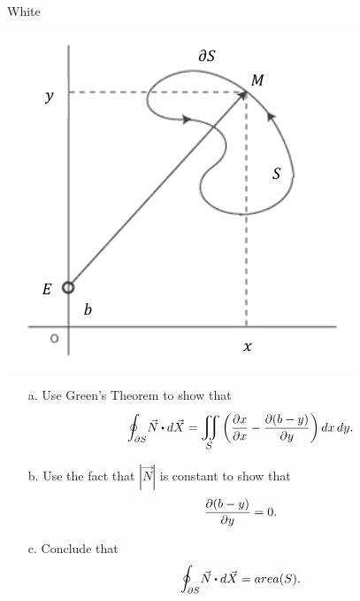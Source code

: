 \documentclass[titlepage]{article}
\begin{document}
\vspace{-.05em}
\begin{cproblem}{4}{White}\ \\
\vspace{-2em}
\begin{center} \includegraphics[scale=.45]{planimeter} \end{center}
\begin{itemize}
\vspace{-2em}
\item[a.] Use Green's Theorem to show that
$$ \mathlarger\oint_{\p S} \vec{N} \bigcdot d\vec{X} = \bigiint{S}{}\left( \frac{\p x}{\p x} - \frac{\p (b-y)}{\p y} \right)dx\,dy.$$
\item[b.] Use the fact that $|\vec{N}|$ is constant to show that
$$\frac{\partial (b-y)}{\partial y} = 0.$$
\item[c.] Conclude that 
$$\mathlarger\oint_{\p S} \vec{N} \bigcdot d\vec{X} = area(S).$$
\end{itemize}
\end{cproblem}
\end{document}
